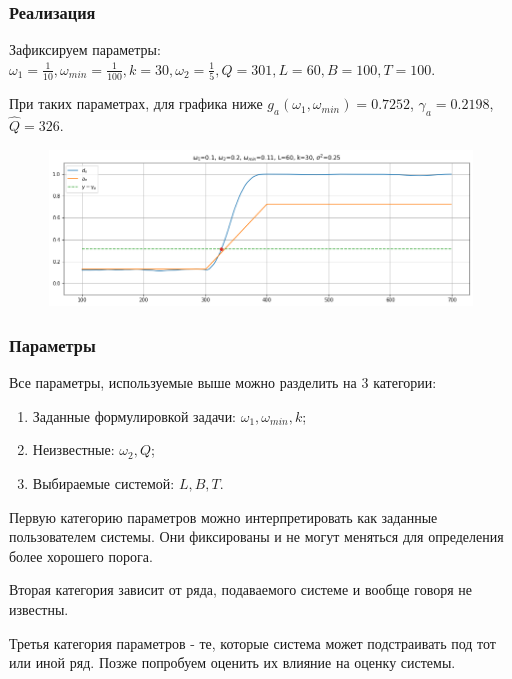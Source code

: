 \documentclass[11pt]{beamer}
\begin{document}
	\begin{frame}
		\frametitle{Реализация}
		Зафиксируем параметры: 
		$ \omega_1=\frac{1}{10}, \omega_{min}=\frac{1}{100}, k=30, \omega_2=\frac{1}{5}, Q=301, L=60, B=100, T=100 $.

		\bigskip

	 	При таких параметрах, для графика ниже $ g_a(\omega_1, \omega_{min}) = 0.7252$,  $ \gamma_a = 0.2198$, $ \hat{Q}=326 $.
		\begin{figure}[b]
			\centering
			\includegraphics[width=\linewidth]{imgs/example_system_work.png}
		\end{figure}
	\end{frame}
	
	\begin{frame}
		\frametitle{Параметры}
		Все параметры, используемые выше можно разделить на 3 категории: 
		\begin{enumerate}
			\item Заданные формулировкой задачи: $ \omega_1, \omega_{min}, k$;
			\item Неизвестные: $ \omega_2, Q $;
			\item Выбираемые системой: $ L, B, T $.
		\end{enumerate}
		
		Первую категорию параметров можно интерпретировать как заданные пользователем системы. Они фиксированы и не могут меняться для определения более хорошего порога.
		
		\bigskip
		
		Вторая категория зависит от ряда, подаваемого системе и вообще говоря не известны.
		
		\bigskip
		
		Третья категория параметров - те, которые система может подстраивать под тот или иной ряд. Позже попробуем оценить их влияние на оценку системы.
	\end{frame}
\end{document}
